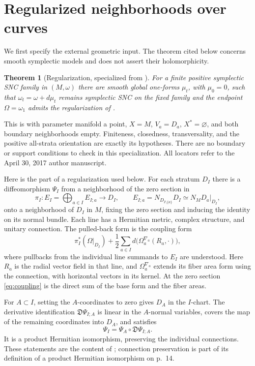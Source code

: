 \documentclass[11pt]{article}
\newtheorem{theorem}{Theorem}[section]
\theoremstyle{definition}
\theoremstyle{remark}
\begin{document}
\section{Regularized neighborhoods over curves}\label{sec:curves}

We first specify the external geometric input. The theorem cited below concerns smooth symplectic models and does not assert their holomorphicity.

\begin{theorem}[Regularization, specialized from \cite{TMZ}]\label{thm:regularization}
For a finite positive symplectic SNC family in $(M,\omega)$ there are smooth global one-forms $\mu_t$, with $\mu_0=0$, such that $\omega_t=\omega+d\mu_t$ remains symplectic SNC on the fixed family and the endpoint $\Omega=\omega_1$ admits the regularization of \cite[Definition 2.12(1)]{TMZ}.
\end{theorem}
This is \cite[Theorem 2.13, p.~17]{TMZ} with parameter manifold a point, $X=M$, $V_a=D_a$, $X^*=\varnothing$, and both boundary neighborhoods empty. Finiteness, closedness, transversality, and the positive all-strata orientation are exactly its hypotheses. There are no boundary or support conditions to check in this specialization. All locators refer to the April 30, 2017 author manuscript.

Here is the part of a regularization used below. For each stratum $D_I$ there is a diffeomorphism $\Psi_I$ from a neighborhood of the zero section in
\[
 \pi_I:E_I=\bigoplus_{a\in I} E_{I;a}\longrightarrow D_I,
 \qquad E_{I;a}=N_{D_{I\setminus\{a\}}}D_I\simeq N_MD_a|_{D_I},
\]
onto a neighborhood of $D_I$ in $M$, fixing the zero section and inducing the identity on its normal bundle. Each line has a Hermitian metric, complex structure, and unitary connection. The pulled-back form is the coupling form
\begin{equation}\label{eq:coupling}
 \pi_I^*(\Omega|_{D_I})+
 \frac12\sum_{a\in I}d\bigl(\Omega_a^{\nabla_a}(R_a,\cdot)\bigr),
\end{equation}
where pullbacks from the individual line summands to $E_I$ are understood. Here $R_a$ is the radial vector field in that line,
 and $\Omega_a^{\nabla_a}$ extends its fiber area form using the connection, with horizontal vectors in its kernel. At the zero section \eqref{eq:coupling} is the direct sum of the base form and the fiber areas.

For $A\subset I$, setting the $A$-coordinates to zero gives $D_A$ in the $I$-chart. The derivative identification $\mathfrak D\Psi_{I;A}$ is linear in the $A$-normal variables, covers the map of the remaining coordinates into $D_A$, and satisfies
\begin{equation}\label{eq:composition}
 \Psi_I=\Psi_A\circ\mathfrak D\Psi_{I;A}.
\end{equation}
It is a product Hermitian isomorphism, preserving the individual connections. These statements are the content of \cite[Definitions 2.8--2.12, equations (2.10)--(2.17)]{TMZ}; connection preservation is part of its definition of a product Hermitian isomorphism on p.~14.
\end{document}
